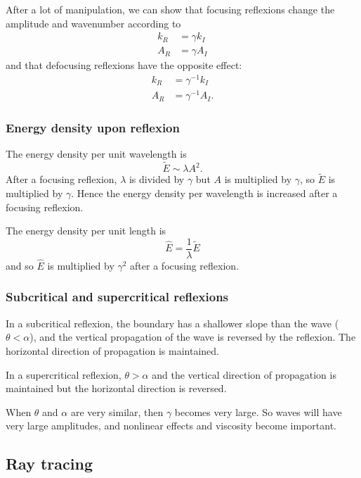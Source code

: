 After a lot of manipulation, we can show that focusing reflexions change the amplitude and wavenumber according to
\begin{align}
	k_R  &= \gamma k_I \\
	A_R &= \gamma A_I 
\end{align}
and that defocusing reflexions have the opposite effect:
\begin{align}
	k_R  &= \gamma^{-1} k_I \\
	A_R &= \gamma^{-1} A_I.
\end{align}

\subsubsection{Energy density upon reflexion}

The energy density per unit wavelength is 
\begin{equation}
	\tilde{E} \sim \lambda A^2.
\end{equation}
After a focusing reflexion, $\lambda$ is divided by $\gamma$ but $A$ is multiplied by $\gamma$, so $\tilde{E}$ is multiplied by $\gamma$. Hence the energy density per wavelength is increased after a focusing reflexion. 

The energy density per unit length is 
\begin{equation}
	\hat{E} = \frac{1}{\lambda} \tilde{E}
\end{equation}
and so $\hat{E}$ is multiplied by $\gamma^2$ after a focusing reflexion.

\subsubsection{Subcritical and supercritical reflexions}

In a subcritical reflexion, the boundary has a shallower slope than the wave ($\theta < \alpha$), and the vertical propagation of the wave is reversed by the reflexion. The horizontal direction of propagation is maintained.

In a supercritical reflexion, $\theta > \alpha$ and the vertical direction of propagation is maintained but the horizontal direction is reversed. 

When $\theta$ and $\alpha$ are very similar, then $\gamma$ becomes very large. So waves will have very large amplitudes, and nonlinear effects and viscosity become important. 

\subsection{Ray tracing}

